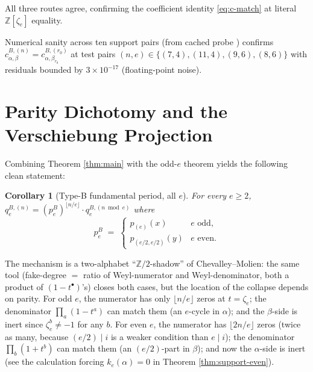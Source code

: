 \documentclass[11pt]{article}
\newtheorem{corollary}[theorem]{Corollary}
\theoremstyle{definition}
\theoremstyle{remark}
\newcommand{\zetae}{\zeta_e}
\newcommand{\ZZ}{\mathbb{Z}}
\newcommand{\peB}{p_e^{B}}
\begin{document}
All three routes agree, confirming the coefficient identity \eqref{eq:c-match} at literal $\ZZ[\zetae]$ equality.

\smallskip

\noindent Numerical sanity across ten support pairs (from cached probe \cite{Cli26-typeB-sanity}) confirms $c^{B,(n)}_{\alpha, \beta} = c^{B,(r_0)}_{\alpha, \beta_{r_0}}$ at test pairs $(n, e) \in \{(7,4), (11,4), (9,6), (8,6)\}$ with residuals bounded by $3 \times 10^{-17}$ (floating-point noise).

\section{Parity Dichotomy and the Verschiebung Projection}\label{sec:parity}

Combining Theorem \ref{thm:main} with the odd-$e$ theorem \cite{Cli26-typeB-odd} yields the following clean statement:

\begin{corollary}[Type-B fundamental period, all $e$]\label{cor:parity}
For every $e \ge 2$, $q_e^{B, (n)} = (\peB)^{\lfloor n/e\rfloor} \cdot q_e^{B, (n \bmod e)}$ where
\[
  \peB \;=\; \begin{cases} p_{(e)}(x) & \text{$e$ odd,}\\ p_{(e/2, e/2)}(y) & \text{$e$ even.}\end{cases}
\]
\end{corollary}

The mechanism is a two-alphabet ``$\ZZ/2$-shadow'' of Chevalley--Molien: the same tool (fake-degree $=$ ratio of Weyl-numerator and Weyl-denominator, both a product of $(1 - t^\bullet)$'s) closes both cases, but the location of the collapse depends on parity. For odd $e$, the numerator has only $\lfloor n/e\rfloor$ zeros at $t = \zetae$; the denominator $\prod_a(1 - t^a)$ can match them (an $e$-cycle in $\alpha$); and the $\beta$-side is inert since $\zetae^b \ne -1$ for any $b$. For even $e$, the numerator has $\lfloor 2n/e\rfloor$ zeros (twice as many, because $(e/2) \mid i$ is a weaker condition than $e \mid i$); the denominator $\prod_b(1 + t^b)$ can match them (an $(e/2)$-part in $\beta$); and now the $\alpha$-side is inert (see the calculation forcing $k_e(\alpha) = 0$ in Theorem \ref{thm:support-even}).
\end{document}
